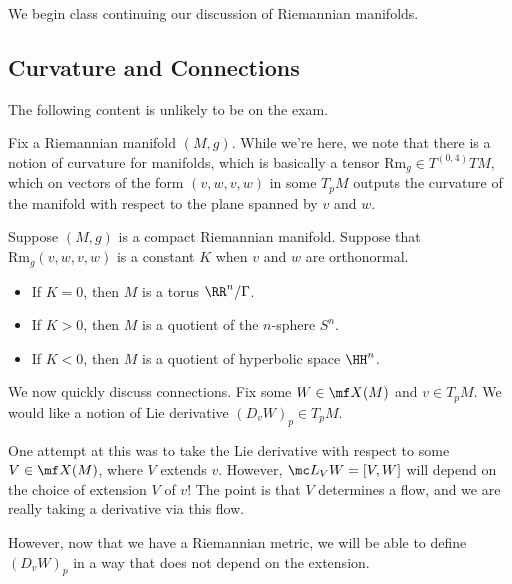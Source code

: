 \documentclass[../notes.tex]{subfiles}
\begin{document}
We begin class continuing our discussion of Riemannian manifolds.

\subsection{Curvature and Connections}
\begin{warn}
	The following content is unlikely to be on the exam.
\end{warn}
Fix a Riemannian manifold $(M,g)$. While we're here, we note that there is a notion of curvature for manifolds, which is basically a tensor $\mathrm{Rm}_g\in T^{(0,4)}TM$, which on vectors of the form $(v,w,v,w)$ in some $T_pM$ outputs the curvature of the manifold with respect to the plane spanned by $v$ and $w$.
\begin{remark}
	Suppose $(M,g)$ is a compact Riemannian manifold. Suppose that $\mathrm{Rm}_g(v,w,v,w)$ is a constant $K$ when $v$ and $w$ are orthonormal.
	\begin{itemize}
		\item If $K=0$, then $M$ is a torus $\RR^n/\Gamma$.
		\item If $K>0$, then $M$ is a quotient of the $n$-sphere $S^n$.
		\item If $K<0$, then $M$ is a quotient of hyperbolic space $\HH^n$.
	\end{itemize}
\end{remark}
We now quickly discuss connections. Fix some $W\in\mf X(M)$ and $v\in T_pM$. We would like a notion of Lie derivative $(D_vW)_p\in T_pM$.
\begin{remark}
	One attempt at this was to take the Lie derivative with respect to some $V\in\mf X(M)$, where $V$ extends $v$. However, $\mc L_VW=[V,W]$ will depend on the choice of extension $V$ of $v$! The point is that $V$ determines a flow, and we are really taking a derivative via this flow.
\end{remark}
However, now that we have a Riemannian metric, we will be able to define $(D_vW)_p$ in a way that does not depend on the extension.
\end{document}
